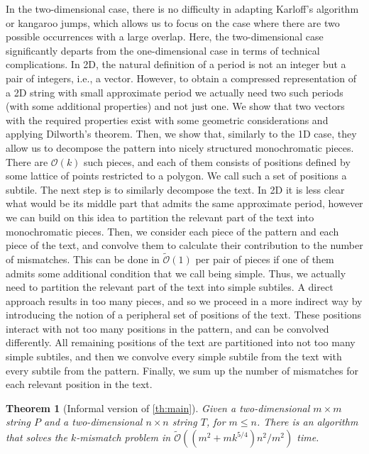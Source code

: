 \documentclass[11pt, letterpaper]{article}
\theoremstyle{plain}
\newtheorem{theorem}{Theorem}
\theoremstyle{definition}
\theoremstyle{remark}
\renewcommand{\O}{\mathcal{O}}
\newcommand{\tO}{\tilde{\mathcal{O}}}
\begin{document}
In the two-dimensional case, there is no difficulty in adapting Karloff's algorithm or kangaroo jumps, which allows
us to focus on the case where there are two possible occurrences with a large overlap. Here, the two-dimensional
case significantly departs from the one-dimensional case in terms of technical complications. In 2D,
the natural definition of a period is not an integer but a pair of integers, i.e., a vector.
However, to obtain a compressed representation of
a 2D string with small approximate period we actually need two such periods (with some additional properties) and not
just one. We show that two vectors with the required properties exist with some geometric considerations and
applying Dilworth's theorem. Then, we show that, similarly to the 1D case, they allow us to decompose the pattern
into nicely structured monochromatic pieces. There are $\O(k)$ such pieces, and each of them consists of positions
defined by some lattice of points restricted to a polygon. We call such a set of positions a subtile.
The next step is to similarly decompose the text. In 2D it is less clear what would be its middle part that
admits the same approximate period, however we can build on this idea to partition the relevant part of the text
into monochromatic pieces. Then, we consider each piece of the pattern and each piece of the text,
and convolve them to calculate their contribution to the number of mismatches. This can be done in $\tO(1)$
per pair of pieces if one of them admits some additional condition that we call being simple.
Thus, we actually need to partition the relevant part of the text into simple subtiles. A direct approach
results in too many pieces, and so we proceed in a more indirect way by introducing the notion of
a peripheral set of positions of the text. These positions interact with not too many positions in the pattern,
and can be convolved differently. All remaining positions of the text are partitioned into not too many simple subtiles,
and then we convolve every simple subtile from the text with every subtile from the pattern.
Finally, we sum up the number of mismatches for each relevant position in the text.

\begin{theorem}[Informal version of \cref{th:main}]
Given a two-dimensional $m \times m$ string $P$ and a two-dimensional $n \times n$ string $T$, for $m \le n$.
There is an algorithm that solves the $k$-mismatch problem in $\tO((m^2 + mk^{5/4})n^2 / m^2)$ time.
\end{theorem}
\end{document}

